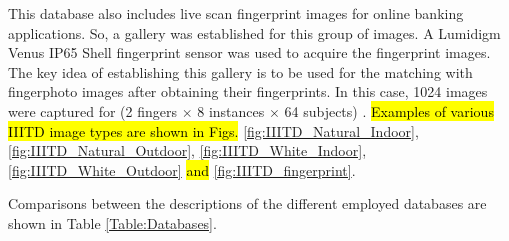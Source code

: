 \documentclass[review]{elsarticle}
\begin{document}
	This database also includes live scan fingerprint images for online banking applications. So, a gallery was established for this group of images. A Lumidigm Venus IP65 Shell fingerprint sensor was used to acquire the fingerprint images. The key idea of establishing this gallery is to be used for the matching with fingerphoto images after obtaining their fingerprints. In this case, 1024 images were captured for (2 fingers $\times$ 8 instances $\times$ 64 subjects) \cite{sankaran2015Onsmartphone}. 
	\hl{Examples of various IIITD image types are shown in Figs.} \ref{fig:IIITD_Natural_Indoor}, \ref{fig:IIITD_Natural_Outdoor}, \ref{fig:IIITD_White_Indoor}, \ref{fig:IIITD_White_Outdoor} \hl{and} \ref{fig:IIITD_fingerprint}.

	Comparisons between the descriptions of the different employed databases are shown in Table \ref{Table:Databases}.
\end{document}
